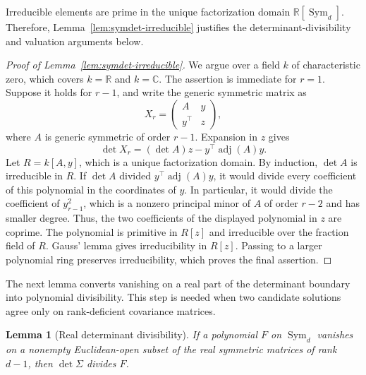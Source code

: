 \documentclass[12pt,a4paper]{article}
\theoremstyle{plain}
\newtheorem{lemma}{Lemma}
\theoremstyle{definition}
\newcommand{\C}{\mathbb{C}}
\newcommand{\R}{\mathbb{R}}
\newcommand{\Sym}{\operatorname{Sym}}
\newcommand{\adjm}{\operatorname{adj}}
\begin{document}
Irreducible elements are prime in the unique factorization domain $\R[\Sym_d]$.
Therefore, Lemma~\ref{lem:symdet-irreducible} justifies the determinant-divisibility and valuation arguments below.

\begin{proof}[Proof of Lemma~\ref{lem:symdet-irreducible}]
    We argue over a field $k$ of characteristic zero, which covers $k=\R$ and $k=\C$.
    The assertion is immediate for $r=1$.
    Suppose it holds for $r-1$, and write the generic symmetric matrix as
    \begin{equation*}
        X_r
        =
        \begin{pmatrix}A&y\\y^\top&z\end{pmatrix}
        ,
    \end{equation*}
    where $A$ is generic symmetric of order $r-1$.
    Expansion in $z$ gives
    \begin{equation*}
        \det X_r
        =
        (\det A)z-y^\top\adjm(A)y
        .
    \end{equation*}
    Let $R=k[A,y]$, which is a unique factorization domain.
    By induction, $\det A$ is irreducible in $R$.
    If $\det A$ divided $y^\top\adjm(A)y$, it would divide every coefficient of this polynomial in the coordinates of $y$.
    In particular, it would divide the coefficient of $y_{r-1}^2$, which is a nonzero principal minor of $A$ of order $r-2$ and has smaller degree.
    Thus, the two coefficients of the displayed polynomial in $z$ are coprime.
    The polynomial is primitive in $R[z]$ and irreducible over the fraction field of $R$.
    Gauss' lemma gives irreducibility in $R[z]$.
    Passing to a larger polynomial ring preserves irreducibility, which proves the final assertion.
\end{proof}

The next lemma converts vanishing on a real part of the determinant boundary into polynomial divisibility.
This step is needed when two candidate solutions agree only on rank-deficient covariance matrices.

\begin{lemma}[Real determinant divisibility]
\label{lem:realdiv-supp}
    If a polynomial $F$ on $\Sym_d$ vanishes on a nonempty Euclidean-open subset of the real symmetric matrices of rank $d-1$, then $\det\Sigma$ divides $F$.
\end{lemma}
\end{document}
